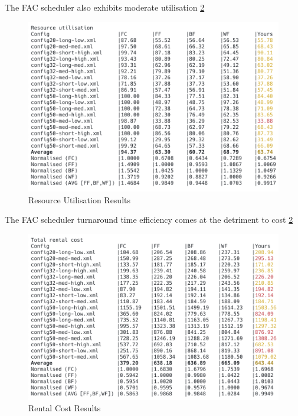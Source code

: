 \documentclass[a4paper]{article} %
\begin{document}
The FAC scheduler also exhibits moderate utilisation \ref{results}
\begin{figure}[H]
    \centering
    \includegraphics[scale=0.5]{images/utilisation.png}
    \caption{Resource Utilisation Results}
    \label{results}
\end{figure}

The FAC scheduler turnaround time efficiency comes at the detriment to cost \ref{results}
\begin{figure}[H]
    \centering
    \includegraphics[scale=0.5]{images/cost.png}
    \caption{Rental Cost Results}
    \label{results}
\end{figure}
\end{document}
